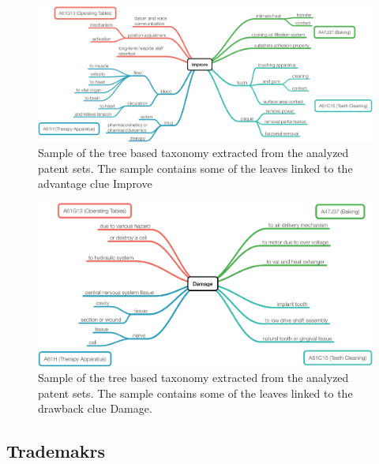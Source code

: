 \documentclass[]{book}
\begin{document}
\begin{figure}

{\centering \includegraphics[width=0.8\linewidth]{_bookdown_files/figures/improve} 

}

\caption{Sample of the tree based taxonomy extracted from the analyzed patent sets. The sample contains some of the leaves linked to the advantage clue Improve}\label{fig:processimagetest1}
\end{figure}

\begin{figure}

{\centering \includegraphics[width=0.8\linewidth]{_bookdown_files/figures/damage} 

}

\caption{Sample of the tree based taxonomy extracted from the analyzed patent sets. The sample contains some of the leaves linked to the drawback clue Damage. }\label{fig:processimagetest2}
\end{figure}

\subsection{Trademakrs}\label{trademakrs}
\end{document}
